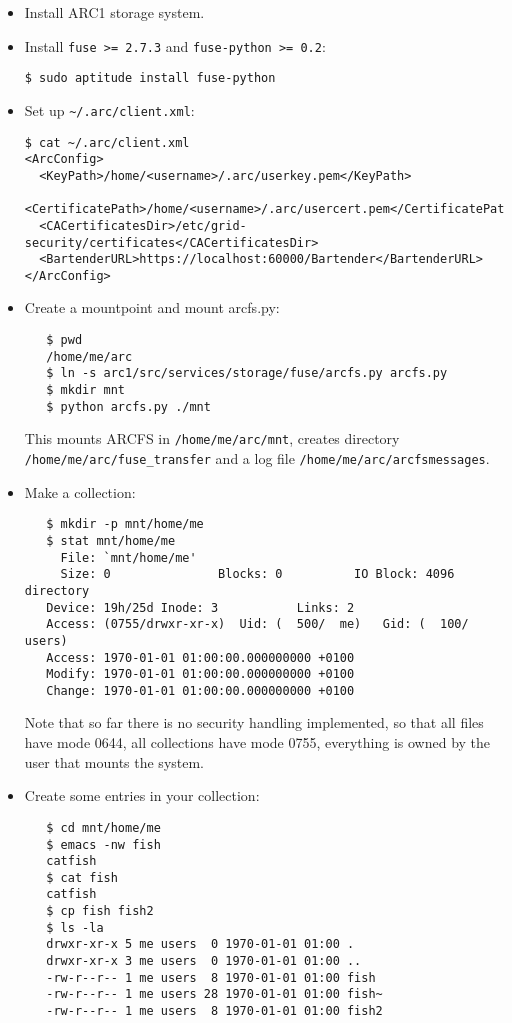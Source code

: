 \documentclass{article}
\begin{document}
\begin{itemize}
\item Install ARC1 storage system.

\item Install \verb!fuse >= 2.7.3! and \verb!fuse-python >= 0.2!:
\begin{verbatim}
$ sudo aptitude install fuse-python
\end{verbatim}

\item Set up \verb!~/.arc/client.xml!:

\begin{verbatim}
$ cat ~/.arc/client.xml 
<ArcConfig>
  <KeyPath>/home/<username>/.arc/userkey.pem</KeyPath>
  <CertificatePath>/home/<username>/.arc/usercert.pem</CertificatePath>
  <CACertificatesDir>/etc/grid-security/certificates</CACertificatesDir>
  <BartenderURL>https://localhost:60000/Bartender</BartenderURL>
</ArcConfig>
\end{verbatim}

\item Create a mountpoint and mount arcfs.py:
\begin{verbatim}
   $ pwd
   /home/me/arc
   $ ln -s arc1/src/services/storage/fuse/arcfs.py arcfs.py
   $ mkdir mnt
   $ python arcfs.py ./mnt 
\end{verbatim}
This mounts ARCFS in \verb!/home/me/arc/mnt!, creates directory
\verb!/home/me/arc/fuse_transfer! and a log file
\verb!/home/me/arc/arcfsmessages!.

\item Make a collection:
\begin{verbatim}   
   $ mkdir -p mnt/home/me
   $ stat mnt/home/me
     File: `mnt/home/me'
     Size: 0               Blocks: 0          IO Block: 4096   directory
   Device: 19h/25d Inode: 3           Links: 2
   Access: (0755/drwxr-xr-x)  Uid: (  500/  me)   Gid: (  100/   users)
   Access: 1970-01-01 01:00:00.000000000 +0100
   Modify: 1970-01-01 01:00:00.000000000 +0100
   Change: 1970-01-01 01:00:00.000000000 +0100
\end{verbatim}
Note that so far there is no security handling implemented, so
that all files have mode 0644, all collections have mode 0755,
everything is owned by the user that mounts the system.

\item Create some entries in your collection:
\begin{verbatim}
   $ cd mnt/home/me
   $ emacs -nw fish
   catfish
   $ cat fish
   catfish
   $ cp fish fish2
   $ ls -la
   drwxr-xr-x 5 me users  0 1970-01-01 01:00 .
   drwxr-xr-x 3 me users  0 1970-01-01 01:00 ..
   -rw-r--r-- 1 me users  8 1970-01-01 01:00 fish
   -rw-r--r-- 1 me users 28 1970-01-01 01:00 fish~
   -rw-r--r-- 1 me users  8 1970-01-01 01:00 fish2
\end{verbatim}


\end{itemize}
\end{document}
